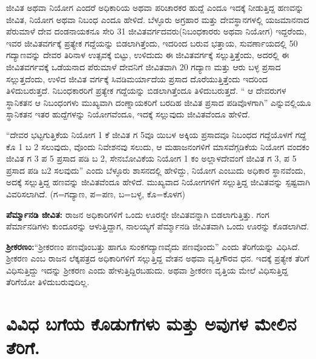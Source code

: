 ಜೀವಿತ ಅಥವಾ ನಿಯೋಗ ಎಂದರೆ ಅಧಿಕಾರಿಯ ಅಥವಾ ಪರಿಚಾರಕರ ಹುದ್ದೆ ಎಂದೂ ಇದಕ್ಕೆ ನೀಡುತ್ತಿದ್ದ ಹಣವನ್ನು ಜೀವಿತ, ನಿಯೋಗ ಅಥವಾ ನಿಬಂಧ ಎಂದೂ ಹೇಳಿದೆ. ಬೆಳ್ಳೂರು ಅಗ್ರಹಾರ ಮತ್ತು ದೇವಸ್ಥಾನಗಳಲ್ಲಿ ಯಜಮಾನನಾದ ಪೆರುಮಾಳೆ ದೇವ ದಂಡನಾಯಕನೂ ಸೇರಿ 31 ಜೀವಿತವರ್ಗದವರು(ನಿಬಂಧಕಾರರು ಅಥವಾ ನಿಯೋಗ) ಇದ್ದರೆಂದು, ಇವರ ಜೀವಿತವರ್ಗಕ್ಕೆ ಪ್ರತ್ಯೇಕ ಗದ್ದೆಯನ್ನು ಬಿಡಲಾಗಿತ್ತೆಂದು, ಇದರಿಂದ ಬರುವ ಭತ್ತಾಯ, ಸುವರ್ಣಾಯದಲ್ಲಿ 50 ಗದ್ಯಾಣವನ್ನು ದೇವರ ತಿರಿನಾಳ ಉತ್ಸವಕ್ಕೆ ಬಿಟ್ಟು, ಉಳಿದುದು ಈ ಜೀವಿತವರ್ಗಕ್ಕೆ ಸಲ್ಲುತ್ತಿತ್ತೆಂದು, ಅದರಲ್ಲಿ ಈ ಜೀವಿತವರ್ಗವಕ್ಕೆ ಒಡೆಯನಾದ ಪೆರುಮಾಳೆ ದೇವನಿಗೆ ಜೀವಿತವಾಗಿ 20 ಗದ್ಯಾಣ ಮತ್ತು ಆರು ಬಳ್ಳ ಪ್ರಸಾದ ಸಲ್ಲುತ್ತದೆಂದು, ಉಳಿದ ಜೀವಿತ ವರ್ಗಕ್ಕೆ ಸಿವಡಿಮರ್ಯಾದೆಯ ಪ್ರಸಾದ ದೊರೆಯುತ್ತಿತ್ತೆಂದು ಇದರಿಂದ ತಿಳಿದುಬರುತ್ತದೆ. ನಿಬಂಧಕಾರರಿಗೆ ಪ್ರತ್ಯೇಕ ಗದ್ದೆಯನ್ನು ಬಿಡಲಾಗಿತ್ತೆಂದೂ ತಿಳಿದುಬರುತ್ತದೆ. “ ಆ ದೇವರುಗಳ ಸ್ಥಾನಿಕತನ ಆ ನಿಬಂಧಂಗಳು ಮುಖ್ಯವಾಗಿ ದಂಣ್ನಾಯಕರಿಗೆ ಬರದಿಹ ಜೀವಿತ ಪ್ರಸಾದ ಪಡಿವೊಳಗಾಗಿ” ಎನ್ನುವಲ್ಲಿಯೂ ಸ್ಥಾನಿಕತನ ಇತರ ಹುದ್ದೆಗಳನ್ನು ನಿಯೋಗವೆಂದೂ, ಇದಕ್ಕೆ ಸಲ್ಲುವುದು ಜೀವಿತವೆಂದೂ ಹೇಳಿದೆ.

“ದೇವರ ಭಟ್ಟಗುತ್ತಿಕೆಯ ನಿಯೋಗ 1 ಕೆ ಜೀವಿತ ಗ 5ವೂ ಯಿಬಳ ಅಕ್ಕಿಯ ಪ್ರಸಾದವೂ ನಿಬಂಧದ ಗದ್ದೆಯೊಳಗೆ ಗದ್ದೆ ಕೊ 1 ಬ 2 ಸಲುವುದು, ವೊಂದು ನಿವೇಶನವು ಸಲುದು, ಆ ಮಹಾಜನಂಗಳಿಗೆ ಮಾಸವೆಗ್ಗಡಿಕೆಯ ನಿಯೋಗ ವಂದಕಂ ಜೀವಿತ ಗ 3 ಪ 5 ಪ್ರಸಾದ ಪಡಿ ಬ 2, ಸೇನಬೋವಿಕೆಯ ನಿಯೋಗ 1 ಕಂ ಅಲ್ಲಾಳದೇವಂಗೆ ಜೀವಿತ ಗ 3, ಪ 5 ಪ್ರಸಾದ ಪಡಿ ಬ2 ಸಲವುದು” ಎಂದು ಬೆಳ್ಳೂರು ಶಾಸನದಲ್ಲಿ ಹೇಳಿದ್ದು, ನಿಯೋಗ ಎಂಬುದು ಅಧಿಕಾರ ಸ್ಥಾನವೆಂದು, ಅದಕ್ಕೆ ಸಲ್ಲುತ್ತಿದ್ದ ಹಣವನ್ನು ಜೀವಿತವೆಂದೂ ಹೇಳಿದೆ. ಮುಖ್ಯವಾದ ನಿಯೋಗಗಳಿಗೆ ಸಲ್ಲುತ್ತಿದ್ದ ಜೀವಿತವನ್ನು ಸ್ಪಷ್ಟವಾಗಿ ವಿವರಿಸಲಾಗಿದೆ. (ಗ=ಗದ್ಯಾಣ, ಪ=ಪಣ, ಬ=ಬಳ್ಳ, ಕೊ=ಕೊಳಗ)

\textbf{ಪೆರ್ಮ್ಮಾನಡಿ ಜೀವಿತ:} ರಾಜನ ಅಧಿಕಾರಿಗಳಿಗೆ ಒಂದು ಊರನ್ನೇ ಜೀವಿತವನ್ನಾಗಿ ಬಿಡಲಾಗುತ್ತಿತ್ತು. ಗಂಗ ಪೆರ್ಮಾನಡಿಗಳು ಕುಂದೂರನ್ನು ಆಳುತ್ತಿದ್ದಾಗ, ನಾಲಯ್ಯಗೆ ಪೆರ್ಮ್ಮಾನಡಿ ಜೀವಿತವಾಗಿ ಒಂದು ಊರನ್ನು ಕೊಡಲಾಗಿದೆ.

\textbf{ಶ‍್ರೀಕರಣಂ:}“ಶ‍್ರೀಕರಣಂ ಪಣವೊಂಬತ್ತು ಹಾಗೂ ಸುಂಕಗದ್ಯಾಣವೈದು ಪಣವೊಂದು” ಎಂದು ತೆರಿಗೆಯನ್ನು ವಿಧಿಸಿದೆ. ಶ‍್ರೀಕರಣ ಎಂಬ ರಾಜನ ಲೆಕ್ಕಪತ್ರದ ಅಧಿಕಾರಿಗಳಿಗೆ ಸಲ್ಲುತ್ತಿದ್ದ ವೇತನ ಅಥವಾ ವೃತ್ತಿಗೌರವ ಧನ. ಇದಕ್ಕೆ ಪ್ರತ್ಯೇಕ ತೆರಿಗೆ ವಿಧಿಸುತ್ತಿದ್ದು ಇದನ್ನು ಶ‍್ರೀಕರಣ ಎಂದು ಹೇಳುತ್ತಿದ್ದಿರಬಹುದು. ಅಥವಾ ಶ‍್ರೀಕರಣ ವೃತ್ತಿಯ ಮೇಲೆ ವಿಧಿಸುತ್ತಿದ್ದ ತೆರಿಗೆಯೋ ತಿಳಿದುಬರುವುದಿಲ್ಲ.

\section{ವಿವಿಧ ಬಗೆಯ ಕೊಡುಗೆಗಳು ಮತ್ತು ಅವುಗಳ ಮೇಲಿನ ತೆರಿಗೆ.}

